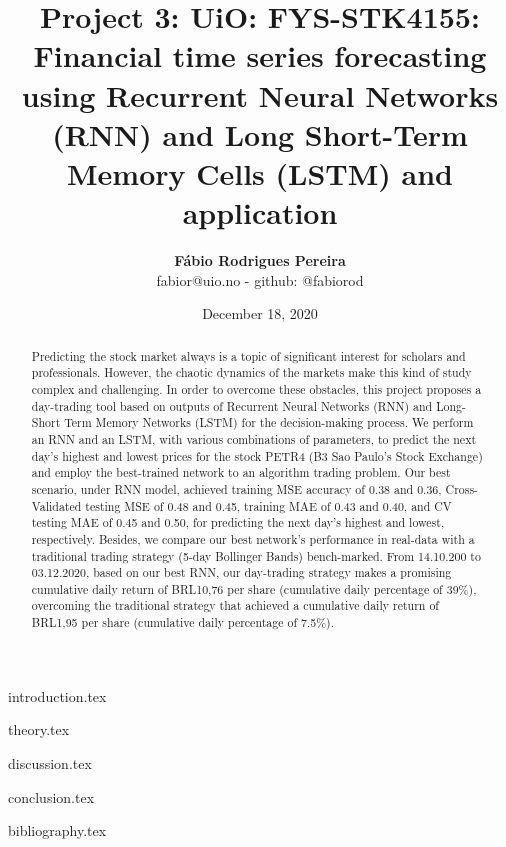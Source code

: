 \documentclass{article}
\title{Project 3: UiO: FYS-STK4155: Financial time series forecasting using Recurrent Neural Networks (RNN) and Long Short-Term Memory Cells (LSTM) and application}
\author{\textbf{Fábio Rodrigues Pereira} \\ \small fabior@uio.no - github: @fabiorod}
\date{December 18, 2020}
\begin{document}
\maketitle
\begin{abstract}
\noindent Predicting the stock market always is a topic of significant interest for scholars and professionals. However, the chaotic dynamics of the markets make this kind of study complex and challenging. In order to overcome these obstacles, this project proposes a day-trading tool based on outputs of Recurrent Neural Networks (RNN) and Long-Short Term Memory Networks (LSTM) for the decision-making process. We perform an RNN and an LSTM, with various combinations of parameters, to predict the next day's highest and lowest prices for the stock PETR4 (B3 Sao Paulo's Stock Exchange) and employ the best-trained network to an algorithm trading problem. Our best scenario, under RNN model, achieved training MSE accuracy of 0.38 and 0.36, Cross-Validated testing MSE of 0.48 and 0.45, training MAE of 0.43 and 0.40, and CV testing MAE of 0.45 and 0.50, for predicting the next day's highest and lowest, respectively. Besides, we compare our best network's performance in real-data with a traditional trading strategy (5-day Bollinger Bands) bench-marked. From 14.10.200 to 03.12.2020, based on our best RNN, our day-trading strategy makes a promising cumulative daily return of BRL10,76 per share (cumulative daily percentage of 39\%), overcoming the traditional strategy that achieved a cumulative daily return of BRL1,95 per share (cumulative daily percentage of 7.5\%).
\end{abstract}

\clearpage
\thispagestyle{empty}

\tableofcontents

\clearpage
\thispagestyle{empty}

{introduction.tex}

\clearpage
\thispagestyle{empty}

{theory.tex}

\clearpage
\thispagestyle{empty}

{discussion.tex}

\clearpage
\thispagestyle{empty}

{conclusion.tex}

\clearpage
\thispagestyle{empty}

{bibliography.tex}
\end{document}
